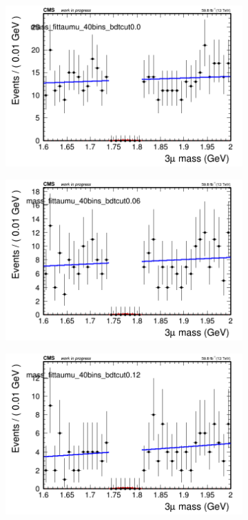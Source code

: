 \begin{figure}[H]
    \centering
    \begin{subfigure}{0.2\textwidth}
        \includegraphics[width=\textwidth]{power_law/plots/taumu/massfit_taumu_40bins_bdtcut0.0.png}
        \caption{}
    \end{subfigure}
    \begin{subfigure}{0.2\textwidth}
        \includegraphics[width=\textwidth]{power_law/plots/taumu/massfit_taumu_40bins_bdtcut0.06.png}
        \caption{}
    \end{subfigure}
    \begin{subfigure}{0.2\textwidth}
        \includegraphics[width=\textwidth]{power_law/plots/taumu/massfit_taumu_40bins_bdtcut0.12.png}

\end{subfigure}
\end{figure}
